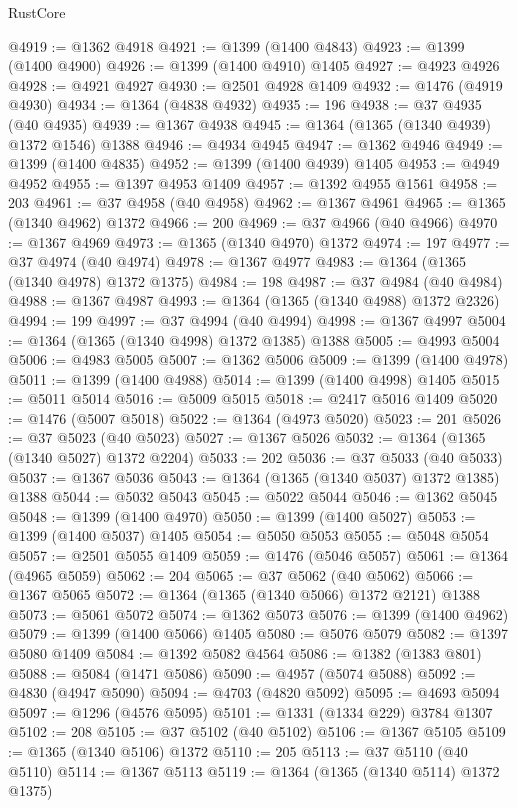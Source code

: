 \begin{lexlean}{RustCore}
\begin{coremodule}
@4919 := @1362 @4918
@4921 := @1399 (@1400 @4843)
@4923 := @1399 (@1400 @4900)
@4926 := @1399 (@1400 @4910) @1405
@4927 := @4923 @4926
@4928 := @4921 @4927
@4930 := @2501 @4928 @1409
@4932 := @1476 (@4919 @4930)
@4934 := @1364 (@4838 @4932)
@4935 := 196
@4938 := @37 @4935 (@40 @4935)
@4939 := @1367 @4938
@4945 := @1364 (@1365 (@1340 @4939) @1372 @1546) @1388
@4946 := @4934 @4945
@4947 := @1362 @4946
@4949 := @1399 (@1400 @4835)
@4952 := @1399 (@1400 @4939) @1405
@4953 := @4949 @4952
@4955 := @1397 @4953 @1409
@4957 := @1392 @4955 @1561
@4958 := 203
@4961 := @37 @4958 (@40 @4958)
@4962 := @1367 @4961
@4965 := @1365 (@1340 @4962) @1372
@4966 := 200
@4969 := @37 @4966 (@40 @4966)
@4970 := @1367 @4969
@4973 := @1365 (@1340 @4970) @1372
@4974 := 197
@4977 := @37 @4974 (@40 @4974)
@4978 := @1367 @4977
@4983 := @1364 (@1365 (@1340 @4978) @1372 @1375)
@4984 := 198
@4987 := @37 @4984 (@40 @4984)
@4988 := @1367 @4987
@4993 := @1364 (@1365 (@1340 @4988) @1372 @2326)
@4994 := 199
@4997 := @37 @4994 (@40 @4994)
@4998 := @1367 @4997
@5004 := @1364 (@1365 (@1340 @4998) @1372 @1385) @1388
@5005 := @4993 @5004
@5006 := @4983 @5005
@5007 := @1362 @5006
@5009 := @1399 (@1400 @4978)
@5011 := @1399 (@1400 @4988)
@5014 := @1399 (@1400 @4998) @1405
@5015 := @5011 @5014
@5016 := @5009 @5015
@5018 := @2417 @5016 @1409
@5020 := @1476 (@5007 @5018)
@5022 := @1364 (@4973 @5020)
@5023 := 201
@5026 := @37 @5023 (@40 @5023)
@5027 := @1367 @5026
@5032 := @1364 (@1365 (@1340 @5027) @1372 @2204)
@5033 := 202
@5036 := @37 @5033 (@40 @5033)
@5037 := @1367 @5036
@5043 := @1364 (@1365 (@1340 @5037) @1372 @1385) @1388
@5044 := @5032 @5043
@5045 := @5022 @5044
@5046 := @1362 @5045
@5048 := @1399 (@1400 @4970)
@5050 := @1399 (@1400 @5027)
@5053 := @1399 (@1400 @5037) @1405
@5054 := @5050 @5053
@5055 := @5048 @5054
@5057 := @2501 @5055 @1409
@5059 := @1476 (@5046 @5057)
@5061 := @1364 (@4965 @5059)
@5062 := 204
@5065 := @37 @5062 (@40 @5062)
@5066 := @1367 @5065
@5072 := @1364 (@1365 (@1340 @5066) @1372 @2121) @1388
@5073 := @5061 @5072
@5074 := @1362 @5073
@5076 := @1399 (@1400 @4962)
@5079 := @1399 (@1400 @5066) @1405
@5080 := @5076 @5079
@5082 := @1397 @5080 @1409
@5084 := @1392 @5082 @4564
@5086 := @1382 (@1383 @801)
@5088 := @5084 (@1471 @5086)
@5090 := @4957 (@5074 @5088)
@5092 := @4830 (@4947 @5090)
@5094 := @4703 (@4820 @5092)
@5095 := @4693 @5094
@5097 := @1296 (@4576 @5095)
@5101 := @1331 (@1334 @229) @3784 @1307
@5102 := 208
@5105 := @37 @5102 (@40 @5102)
@5106 := @1367 @5105
@5109 := @1365 (@1340 @5106) @1372
@5110 := 205
@5113 := @37 @5110 (@40 @5110)
@5114 := @1367 @5113
@5119 := @1364 (@1365 (@1340 @5114) @1372 @1375)

\end{coremodule}
\end{lexlean}
